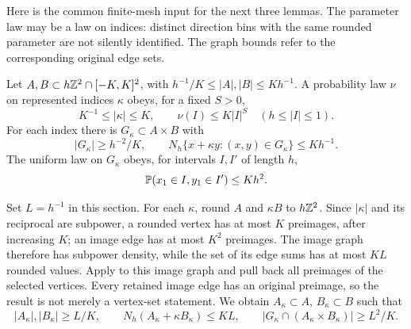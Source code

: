 Here is the common finite-mesh input for the next three lemmas.  The
parameter law may be a law on indices: distinct direction bins with the
same rounded parameter are not silently identified.  The graph bounds
refer to the corresponding original edge sets.

\begin{assumption}\label{re:graph-data}
Let \(A,B\subset h\mathbb Z^2\cap[-K,K]^2\), with
\(h^{-1}/K\le |A|,|B|\le Kh^{-1}\).  A probability law \(\nu\) on
represented indices \(\kappa\) obeys, for a fixed \(S>0\),
\begin{equation}\label{re:ratio-cap}
 K^{-1}\le|\kappa|\le K,\qquad
 \nu(I)\le K|I|^S\quad(h\le |I|\le1).
\end{equation}
For each index there is \(G_\kappa\subset A\times B\) with
\begin{equation}\label{re:graph-hypotheses}
 |G_\kappa|\ge h^{-2}/K,\qquad
 N_h\{x+\kappa y:(x,y)\in G_\kappa\}\le Kh^{-1}.
\end{equation}
The uniform law on \(G_\kappa\) obeys, for intervals \(I,I'\) of
length \(h\),
\begin{equation}\label{re:first-coordinate-cap}
 \mathbb P(x_1\in I,y_1\in I')\le Kh^2.
\end{equation}
\end{assumption}

Set \(L=h^{-1}\) in this section.  For each \(\kappa\), round
\(A\) and \(\kappa B\) to \(h\mathbb Z^2\).  Since \(|\kappa|\) and its
reciprocal are subpower, a rounded vertex has at most \(K\)
preimages, after increasing \(K\); an image edge has at most \(K^2\)
preimages.  The image graph therefore has subpower density, while
the set of its edge sums has at most \(KL\) rounded values.
Apply  to this image graph and pull back all
preimages of the selected vertices.  Every retained image edge has
an original preimage, so the result is not merely a vertex-set
statement.  We obtain \(A_\kappa\subset A\), \(B_\kappa\subset B\)
such that
\begin{equation}\label{re:individual-bsg}
 |A_\kappa|,|B_\kappa|\ge L/K,\qquad
 N_h(A_\kappa+\kappa B_\kappa)\le KL,\qquad
 |G_\kappa\cap(A_\kappa\times B_\kappa)|\ge L^2/K.
\end{equation}

